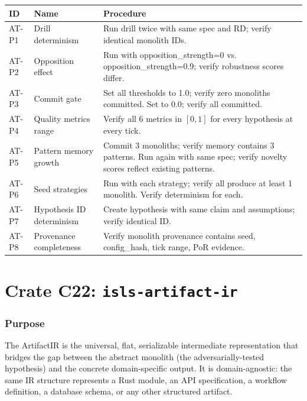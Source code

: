 \documentclass[11pt,a4paper,twoside]{article}
\theoremstyle{definition}
\theoremstyle{plain}
\theoremstyle{remark}
\begin{document}
\begin{longtable}{l l p{6.5cm}}
\toprule
\textbf{ID} & \textbf{Name} & \textbf{Procedure} \\
\midrule
\endfirsthead \midrule \endhead \bottomrule \endfoot
AT-P1 & Drill determinism & Run drill twice with same spec and RD;
  verify identical monolith IDs. \\
AT-P2 & Opposition effect & Run with opposition\_strength=0 vs.
  opposition\_strength=0.9; verify robustness scores differ. \\
AT-P3 & Commit gate & Set all thresholds to 1.0; verify zero
  monoliths committed. Set to 0.0; verify all committed. \\
AT-P4 & Quality metrics range & Verify all 6 metrics in $[0,1]$ for
  every hypothesis at every tick. \\
AT-P5 & Pattern memory growth & Commit 3 monoliths; verify memory
  contains 3 patterns. Run again with same spec; verify novelty scores
  reflect existing patterns. \\
AT-P6 & Seed strategies & Run with each strategy; verify all produce
  at least 1 monolith. Verify determinism for each. \\
AT-P7 & Hypothesis ID determinism & Create hypothesis with same claim
  and assumptions; verify identical ID. \\
AT-P8 & Provenance completeness & Verify monolith provenance contains
  seed, config\_hash, tick range, PoR evidence. \\
\end{longtable}


\part{Crate C22: \texttt{isls-artifact-ir}}\label{part:ir}

\section{Purpose}\label{sec:ir:purpose}

The ArtifactIR is the universal, flat, serializable intermediate
representation that bridges the gap between the abstract monolith
(the adversarially-tested hypothesis) and the concrete domain-specific
output. It is domain-agnostic: the same IR structure represents a Rust
module, an API specification, a workflow definition, a database schema,
or any other structured artifact.
\end{document}
